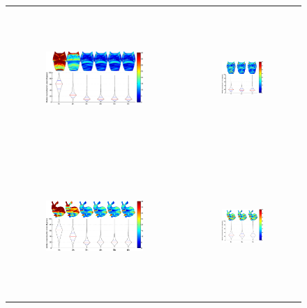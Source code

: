 \begin{figure}
\centering
\footnotesize
\begin{tabular}{cc}
\hspace{0.1cm}\includegraphics[height=5.35cm,width=0.58\textwidth]{recons/owl-left.pdf} & 
\includegraphics[height=5.35cm,width=0.38\textwidth]{recons/owl-right.pdf} \\
\includegraphics[height=5.35cm,width=0.58\textwidth]{recons/bunny-left.pdf} & 
\includegraphics[height=5.35cm,width=0.38\textwidth]{recons/bunny-right.pdf} \\

\end{tabular}
\end{figure}
